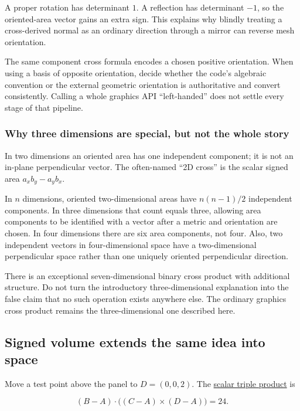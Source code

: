 A proper rotation has determinant \(1\). A reflection has determinant \(-1\), so the oriented-area vector gains an extra sign. This explains why blindly treating a cross-derived normal as an ordinary direction through a mirror can reverse mesh orientation.

The same component cross formula encodes a chosen positive orientation. When using a basis of opposite orientation, decide whether the code's algebraic convention or the external geometric orientation is authoritative and convert consistently. Calling a whole graphics API ``left-handed'' does not settle every stage of that pipeline.

\subsubsection{Why three dimensions are special, but not the whole story}\label{why-three-dimensions-are-special-but-not-the-whole-story}

In two dimensions an oriented area has one independent component; it is not an in-plane perpendicular vector. The often-named ``2D cross'' is the scalar signed area \(a_xb_y-a_yb_x\).

In \(n\) dimensions, oriented two-dimensional areas have \(n(n-1)/2\) independent components. In three dimensions that count equals three, allowing area components to be identified with a vector after a metric and orientation are chosen. In four dimensions there are six area components, not four. Also, two independent vectors in four-dimensional space have a two-dimensional perpendicular space rather than one uniquely oriented perpendicular direction.

There is an exceptional seven-dimensional binary cross product with additional structure. Do not turn the introductory three-dimensional explanation into the false claim that no such operation exists anywhere else. The ordinary graphics cross product remains the three-dimensional one described here.

\subsection{Signed volume extends the same idea into space}\label{signed-volume-extends-the-same-idea-into-space}

Move a test point above the panel to \(D=(0,0,2)\). The \hyperref[01-foundations-i-ch017]{scalar triple product} is

\[
(B-A)\cdot\big((C-A)\times(D-A)\big)=24.
\]

